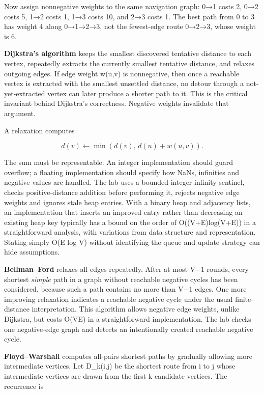 \hypertarget{01-foundations-i-ch008-shortest-paths-the-edge-assumptions-determine-the-proof}{}

Now assign nonnegative weights to the same navigation graph: 0→1 costs 2, 0→2 costs 5, 1→2 costs 1, 1→3 costs 10, and 2→3 costs 1. The best path from 0 to 3 has weight 4 along 0→1→2→3, not the fewest-edge route 0→2→3, whose weight is 6.

\textbf{Dijkstra's algorithm} keeps the smallest discovered tentative distance to each vertex, repeatedly extracts the currently smallest tentative distance, and relaxes outgoing edges. If edge weight w(u,v) is nonnegative, then once a reachable vertex is extracted with the smallest unsettled distance, no detour through a not-yet-extracted vertex can later produce a shorter path to it. This is the critical invariant behind Dijkstra's correctness. Negative weights invalidate that argument.

A relaxation computes

\[
d(v)\leftarrow\min(d(v),\,d(u)+w(u,v)).
\]

The sum must be representable. An integer implementation should guard overflow; a floating implementation should specify how NaNs, infinities and negative values are handled. The lab uses a bounded integer infinity sentinel, checks positive-distance addition before performing it, rejects negative edge weights and ignores stale heap entries. With a binary heap and adjacency lists, an implementation that inserts an improved entry rather than decreasing an existing heap key typically has a bound on the order of O((V+E)log(V+E)) in a straightforward analysis, with variations from data structure and representation. Stating simply O(E log V) without identifying the queue and update strategy can hide assumptions.

\textbf{Bellman--Ford} relaxes all edges repeatedly. After at most V−1 rounds, every shortest \emph{simple} path in a graph without reachable negative cycles has been considered, because such a path contains no more than V−1 edges. One more improving relaxation indicates a reachable negative cycle under the usual finite-distance interpretation. This algorithm allows negative edge weights, unlike Dijkstra, but costs O(VE) in a straightforward implementation. The lab checks one negative-edge graph and detects an intentionally created reachable negative cycle.

\textbf{Floyd--Warshall} computes all-pairs shortest paths by gradually allowing more intermediate vertices. Let D\_k(i,j) be the shortest route from i to j whose intermediate vertices are drawn from the first k candidate vertices. The recurrence is

